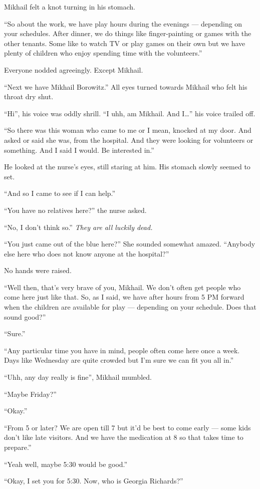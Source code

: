 Mikhail felt a knot turning in his stomach.

“So about the work, we have play hours during the evenings — depending on your schedules. After dinner, we do things like finger-painting or games with the other tenants. Some like to watch TV or play games on their own but we have plenty of children who enjoy spending time with the volunteers.”

Everyone nodded agreeingly. Except Mikhail.

“Next we have Mikhail Borowitz.” All eyes turned towards Mikhail who felt his throat dry shut.

“Hi”, his voice was oddly shrill. “I uhh, am Mikhail. And I…” his voice trailed off.

“So there was this woman who came to me or I mean, knocked at my door. And asked or said she was, from the hospital. And they were looking for volunteers or something. And I said I would. Be interested in.”

He looked at the nurse’s eyes, still staring at him. His stomach slowly seemed to set.

“And so I came to see if I can help.”

“You have no relatives here?” the nurse asked.

“No, I don’t think so.” \textit{They are all luckily dead.}

“You just came out of the blue here?” She sounded somewhat amazed. “Anybody else here who does not know anyone at the hospital?”

No hands were raised. 

“Well then, that’s very brave of you, Mikhail. We don’t often get people who come here just like that. So, as I said, we have after hours from 5 PM forward when the children are available for play — depending on your schedule. Does that sound good?”

“Sure.”

“Any particular time you have in mind, people often come here once a week. Days like Wednesday are quite crowded but I’m sure we can fit you all in.”

“Uhh, any day really is fine”, Mikhail mumbled.

“Maybe Friday?”

“Okay.”

“From 5 or later? We are open till 7 but it’d be best to come early — some kids don’t like late visitors. And we have the medication at 8 so that takes time to prepare.”

“Yeah well, maybe 5:30 would be good.”

“Okay, I set you for 5:30. Now, who is Georgia Richards?”
